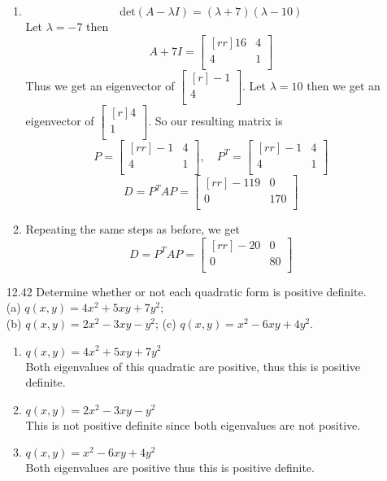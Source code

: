 \documentclass[12pt]{article}
\theoremstyle{plain}
\theoremstyle{definition}
\theoremstyle{plain}
\begin{document}
\begin{enumerate}
\begin{enumerate}
	\item
		\[ \mathrm{det}(A-\lambda I) = (\lambda+7)(\lambda-10) \]
		Let $\lambda=-7$ then
		\[ A+7I = \begin{bmatrix}[rr]16&4\\4&1\\\end{bmatrix} \]
		Thus we get an eigenvector of $\begin{bmatrix}[r]-1\\4\\\end{bmatrix}$.
		Let $\lambda=10$ then we get an eigenvector of $\begin{bmatrix}[r]4\\1\\\end{bmatrix}$.
		So our resulting matrix is
		\[ P=\begin{bmatrix}[rr]-1&4\\4&1\\\end{bmatrix}, \quad P^T = \begin{bmatrix}[rr]-1&4\\4&1\\\end{bmatrix} \]
		\[ D = P^TAP = \begin{bmatrix}[rr]-119&0\\0&170\\\end{bmatrix} \]
		
	\item
		Repeating the same steps as before, we get
		\[ D = P^TAP = \begin{bmatrix}[rr]-20&0\\0&80\\\end{bmatrix} \]
	\end{enumerate}

\item[12.42]Determine whether or not each quadratic form is positive definite.\\
(a) $q(x,y) = 4x^2+5xy+7y^2$;\\
(b) $q(x,y)=2x^2-3xy-y^2$; (c) $q(x,y)=x^2-6xy+4y^2$.
	\begin{enumerate}
	\item $q(x,y)=4x^2+5xy+7y^2$\\
		Both eigenvalues of this quadratic are positive, thus this is positive definite.
	\item $q(x,y)=2x^2-3xy-y^2$\\
		This is not positive definite since both eigenvalues are not positive.
	\item $q(x,y)=x^2-6xy+4y^2$\\
		Both eigenvalues are positive thus this is positive definite.
	\end{enumerate}
\end{enumerate}
\end{document}
